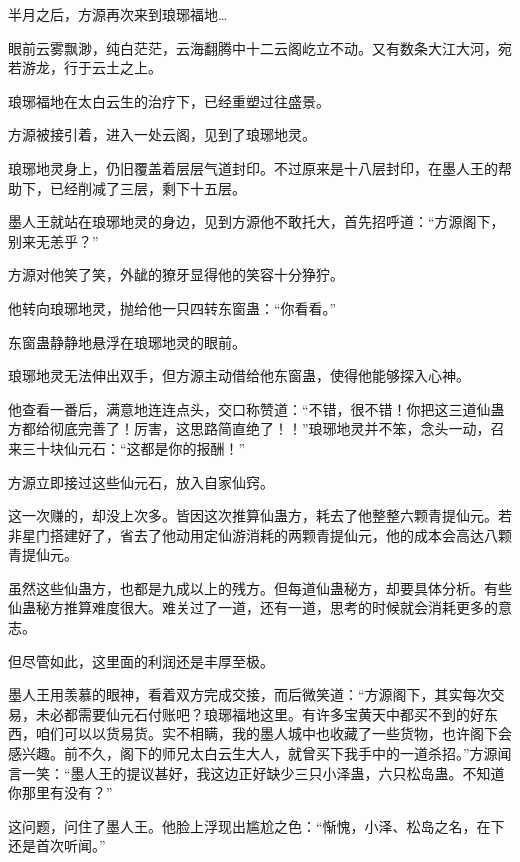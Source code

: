 
\begin{this_body}



半月之后，方源再次来到琅琊福地…

眼前云雾飘渺，纯白茫茫，云海翻腾中十二云阁屹立不动。又有数条大江大河，宛若游龙，行于云土之上。

琅琊福地在太白云生的治疗下，已经重塑过往盛景。

方源被接引着，进入一处云阁，见到了琅琊地灵。

琅琊地灵身上，仍旧覆盖着层层气道封印。不过原来是十八层封印，在墨人王的帮助下，已经削减了三层，剩下十五层。

墨人王就站在琅琊地灵的身边，见到方源他不敢托大，首先招呼道：“方源阁下，别来无恙乎？”

方源对他笑了笑，外龇的獠牙显得他的笑容十分狰狞。

他转向琅琊地灵，抛给他一只四转东窗蛊：“你看看。”

东窗蛊静静地悬浮在琅琊地灵的眼前。

琅琊地灵无法伸出双手，但方源主动借给他东窗蛊，使得他能够探入心神。

他查看一番后，满意地连连点头，交口称赞道：“不错，很不错！你把这三道仙蛊方都给彻底完善了！厉害，这思路简直绝了！！”琅琊地灵并不笨，念头一动，召来三十块仙元石：“这都是你的报酬！”

方源立即接过这些仙元石，放入自家仙窍。

这一次赚的，却没上次多。皆因这次推算仙蛊方，耗去了他整整六颗青提仙元。若非星门搭建好了，省去了他动用定仙游消耗的两颗青提仙元，他的成本会高达八颗青提仙元。

虽然这些仙蛊方，也都是九成以上的残方。但每道仙蛊秘方，却要具体分析。有些仙蛊秘方推算难度很大。难关过了一道，还有一道，思考的时候就会消耗更多的意志。

但尽管如此，这里面的利润还是丰厚至极。

墨人王用羡慕的眼神，看着双方完成交接，而后微笑道：“方源阁下，其实每次交易，未必都需要仙元石付账吧？琅琊福地这里。有许多宝黄天中都买不到的好东西，咱们可以以货易货。实不相瞒，我的墨人城中也收藏了一些货物，也许阁下会感兴趣。前不久，阁下的师兄太白云生大人，就曾买下我手中的一道杀招。”方源闻言一笑：“墨人王的提议甚好，我这边正好缺少三只小泽蛊，六只松岛蛊。不知道你那里有没有？”

这问题，问住了墨人王。他脸上浮现出尴尬之色：“惭愧，小泽、松岛之名，在下还是首次听闻。”


\end{this_body}
